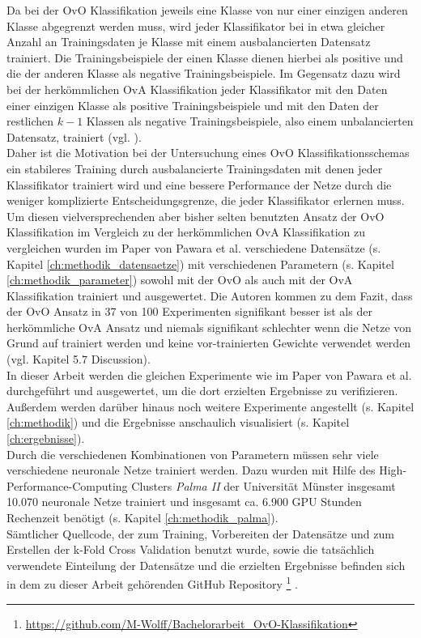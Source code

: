 Da bei der OvO Klassifikation jeweils eine Klasse von nur einer einzigen anderen Klasse abgegrenzt werden muss, wird jeder Klassifikator bei in etwa gleicher Anzahl an Trainingsdaten je Klasse mit einem ausbalancierten Datensatz trainiert. Die Trainingsbeispiele der einen Klasse dienen hierbei als positive und die der anderen Klasse als negative Trainingsbeispiele.
Im Gegensatz dazu wird bei der herkömmlichen OvA Klassifikation jeder Klassifikator mit den Daten einer einzigen Klasse als positive Trainingsbeispiele und mit den Daten der restlichen $k-1$ Klassen als negative Trainingsbeispiele, also einem unbalancierten Datensatz, trainiert (vgl. \cite{pawaraPaper}).\\

Daher ist die Motivation bei der Untersuchung eines OvO Klassifikationsschemas ein stabileres Training durch ausbalancierte Trainingsdaten mit denen jeder Klassifikator trainiert wird und eine bessere Performance der Netze durch die weniger komplizierte  Entscheidungsgrenze, die jeder Klassifikator erlernen muss.\\

Um diesen vielversprechenden aber bisher selten benutzten Ansatz der OvO Klassifikation im Vergleich zu der herkömmlichen OvA Klassifikation zu vergleichen wurden im Paper von Pawara et al. \cite{pawaraPaper} verschiedene Datensätze (s. Kapitel \ref{ch:methodik_datensaetze}) mit verschiedenen Parametern (s. Kapitel \ref{ch:methodik_parameter}) sowohl mit der OvO als auch mit der OvA Klassifikation trainiert und ausgewertet.
Die Autoren kommen zu dem Fazit, dass der OvO Ansatz in 37 von 100 Experimenten signifikant besser ist als der herkömmliche OvA Ansatz und niemals signifikant schlechter wenn die Netze von Grund auf trainiert werden und keine vor-trainierten Gewichte verwendet werden (vgl. \cite{pawaraPaper} Kapitel 5.7 Discussion).\\

In dieser Arbeit werden die gleichen Experimente wie im Paper von Pawara et al. \cite{pawaraPaper} durchgeführt und ausgewertet, um die dort erzielten Ergebnisse zu verifizieren. Außerdem werden darüber hinaus noch weitere Experimente angestellt (s. Kapitel \ref{ch:methodik}) und die Ergebnisse anschaulich visualisiert (s. Kapitel \ref{ch:ergebnisse}).\\

Durch die verschiedenen Kombinationen von Parametern müssen sehr viele verschiedene neuronale Netze trainiert werden. Dazu wurden mit Hilfe des High-Performance-Computing Clusters \textit{Palma II} der Universität Münster \cite{palma2} insgesamt 10.070 neuronale Netze trainiert und insgesamt ca. 6.900 GPU Stunden Rechenzeit benötigt (s. Kapitel \ref{ch:methodik_palma}).\\

Sämtlicher Quellcode, der zum Training, Vorbereiten der Datensätze und zum Erstellen der k-Fold Cross Validation benutzt wurde, sowie die tatsächlich verwendete Einteilung der Datensätze und die erzielten Ergebnisse befinden sich in dem zu dieser Arbeit gehörenden GitHub Repository \footnote{\url{https://github.com/M-Wolff/Bachelorarbeit_OvO-Klassifikation}} \cite{githubRepo}.